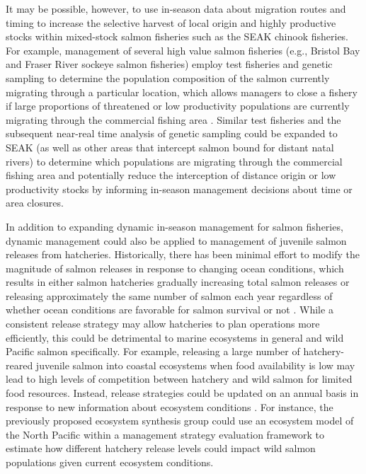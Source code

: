 It may be possible, however, to use in-season data about migration routes and
timing to increase the selective harvest of local origin and highly productive
stocks within mixed-stock salmon fisheries such as the SEAK chinook fisheries.
For example, management of several high value salmon fisheries (e.g., Bristol
Bay and Fraser River sockeye salmon fisheries) employ test fisheries and genetic
sampling to determine the population composition of the salmon currently
migrating through a particular location, which allows managers to close a
fishery if large proportions of threatened or low productivity populations are
currently migrating through the commercial fishing area \citep{Dann2013}.
Similar test fisheries and the subsequent near-real time analysis of genetic
sampling could be expanded to SEAK (as well as other areas that intercept salmon
bound for distant natal rivers) to determine which populations are migrating
through the commercial fishing area and potentially reduce the interception of
distance origin or low productivity stocks by informing in-season management
decisions about time or area closures.

In addition to expanding dynamic in-season management for salmon fisheries,
dynamic management could also be applied to management of juvenile salmon
releases from hatcheries. Historically, there has been minimal effort to modify
the magnitude of salmon releases in response to changing ocean conditions, which
results in either salmon hatcheries gradually increasing total salmon releases
or releasing approximately the same number of salmon each year regardless of
whether ocean conditions are favorable for salmon survival or not
\citep{Pearsons2010a}. While a consistent release strategy may allow hatcheries
to plan operations more efficiently, this could be detrimental to marine
ecosystems in general and wild Pacific salmon specifically. For example,
releasing a large number of hatchery-reared juvenile salmon into coastal
ecosystems when food availability is low may lead to high levels of competition
between hatchery and wild salmon for limited food resources. Instead, release
strategies could be updated on an annual basis in response to new information
about ecosystem conditions \citep{Pearsons2010a, Peterman1983a}. For instance,
the previously proposed ecosystem synthesis group could use an ecosystem model
of the North Pacific within a management strategy evaluation framework to
estimate how different hatchery release levels could impact wild salmon
populations given current ecosystem conditions.



